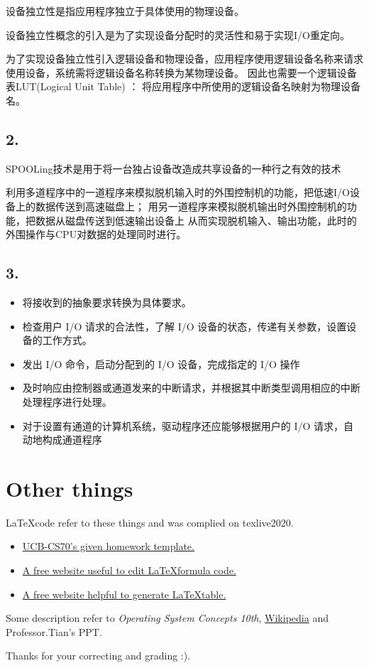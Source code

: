 \documentclass[11pt]{article}
\begin{document}
设备独立性是指应用程序独立于具体使用的物理设备。

设备独立性概念的引入是为了实现设备分配时的灵活性和易于实现I/O重定向。

为了实现设备独立性引入逻辑设备和物理设备，应用程序使用逻辑设备名称来请求使用设备，系统需将逻辑设备名称转换为某物理设备。
因此也需要一个逻辑设备表LUT(Logical Unit Table) ： 将应用程序中所使用的逻辑设备名映射为物理设备名。

\subsection*{2. }

SPOOLing技术是用于将一台独占设备改造成共享设备的一种行之有效的技术

利用多道程序中的一道程序来模拟脱机输入时的外围控制机的功能，把低速I/O设备上的数据传送到高速磁盘上；
用另一道程序来模拟脱机输出时外围控制机的功能，把数据从磁盘传送到低速输出设备上
从而实现脱机输入、输出功能，此时的外围操作与CPU对数据的处理同时进行。

\subsection*{3. }

\begin{itemize}
    \item 将接收到的抽象要求转换为具体要求。
    \item 检查用户 I/O 请求的合法性，了解 I/O 设备的状态，传递有关参数，设置设备的工作方式。
    \item 发出 I/O 命令，启动分配到的 I/O 设备，完成指定的 I/O 操作
    \item 及时响应由控制器或通道发来的中断请求，并根据其中断类型调用相应的中断处理程序进行处理。
    \item 对于设置有通道的计算机系统，驱动程序还应能够根据用户的 I/O 请求，自动地构成通道程序
\end{itemize}

\section*{Other things}

    \LaTeX \space code refer to these things and was complied on texlive2020.
    \begin{itemize}
        \item  \href{https://www.eecs70.org/assets/misc/homework_template.tex}{UCB-CS70's given homework template.} 
        \item  \href{https://www.latexlive.com}{A free website useful to edit \LaTeX \space formula code.}
        \item  \href{https://www.tablesgenerator.com/}{A free website helpful to generate \LaTeX \space table.}
    \end{itemize}

    Some description refer to \textit{Operating System Concepts 10th}, \href{https://en.wikipedia.org}{Wikipedia} 
    and Professor.Tian's PPT.

    Thanks for your correcting and grading :).
\end{document}

